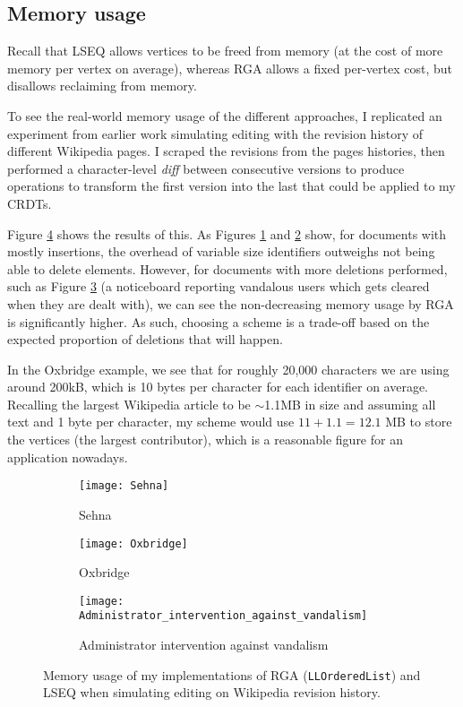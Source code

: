 \documentclass[diss.tex]{subfiles}
\begin{document}
\subsection{Memory usage}
Recall that LSEQ allows vertices to be freed from memory (at the cost of more memory per vertex on average), whereas RGA allows a fixed per-vertex cost, but disallows reclaiming from memory.

To see the real-world memory usage of the different approaches, I replicated an experiment from earlier work \cite{lseq, logootundo} simulating editing with the revision history of different Wikipedia pages. I scraped the revisions from the pages histories, then performed a character-level \textit{diff} between consecutive versions to produce operations to transform the first version into the last that could be applied to my CRDTs.

Figure \ref{fig:wiki_edits} shows the results of this. As Figures \ref{fig:sehna} and \ref{fig:oxbridge} show, for documents with mostly insertions, the overhead of variable size identifiers outweighs not being able to delete elements. However, for documents with more deletions performed, such as Figure \ref{fig:wiki_admin} (a noticeboard reporting vandalous users which gets cleared when they are dealt with), we can see the non-decreasing memory usage by RGA is significantly higher. As such, choosing a scheme is a trade-off based on the expected proportion of deletions that will happen.

In the Oxbridge example, we see that for roughly 20,000 characters we are using around 200kB, which is 10 bytes per character for each identifier on average. Recalling the largest Wikipedia article to be $\sim$1.1MB in size and assuming all text and 1 byte per character, my scheme would use $11 + 1.1 = 12.1$ MB to store the vertices (the largest contributor), which is a reasonable figure for an application nowadays.
%
%
\begin{figure}[H]
\vspace{-3cm}

\begin{subfigure}{\linewidth}
\centering
\texttt{[image: Sehna]}
\caption{Sehna}
\label{fig:sehna}
\end{subfigure}

\begin{subfigure}{\linewidth}
\centering
\texttt{[image: Oxbridge]}
\caption{Oxbridge}
\label{fig:oxbridge}
\end{subfigure}

\begin{subfigure}{\linewidth}
\centering
\texttt{[image: Administrator\_intervention\_against\_vandalism]}
\caption{Administrator intervention against vandalism}
\label{fig:wiki_admin}
\end{subfigure}
\caption{Memory usage of my implementations of RGA (\texttt{LLOrderedList}) and LSEQ when simulating editing on Wikipedia revision history.} 
\label{fig:wiki_edits}
\end{figure}
\end{document}
